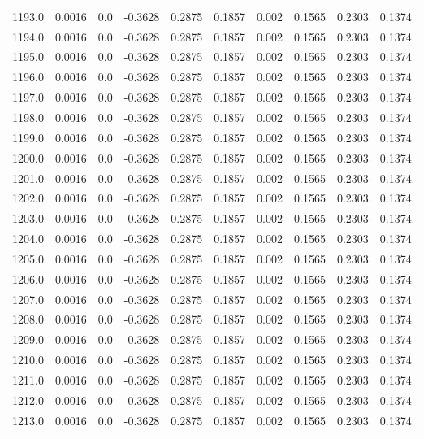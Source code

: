 \begin{longtable}{lrrrrrrrrr}
1193.0 & 0.0016 & 0.0 & -0.3628 & 0.2875 & 0.1857 & 0.002 & 0.1565 & 0.2303 & 0.1374 \\
1194.0 & 0.0016 & 0.0 & -0.3628 & 0.2875 & 0.1857 & 0.002 & 0.1565 & 0.2303 & 0.1374 \\
1195.0 & 0.0016 & 0.0 & -0.3628 & 0.2875 & 0.1857 & 0.002 & 0.1565 & 0.2303 & 0.1374 \\
1196.0 & 0.0016 & 0.0 & -0.3628 & 0.2875 & 0.1857 & 0.002 & 0.1565 & 0.2303 & 0.1374 \\
1197.0 & 0.0016 & 0.0 & -0.3628 & 0.2875 & 0.1857 & 0.002 & 0.1565 & 0.2303 & 0.1374 \\
1198.0 & 0.0016 & 0.0 & -0.3628 & 0.2875 & 0.1857 & 0.002 & 0.1565 & 0.2303 & 0.1374 \\
1199.0 & 0.0016 & 0.0 & -0.3628 & 0.2875 & 0.1857 & 0.002 & 0.1565 & 0.2303 & 0.1374 \\
1200.0 & 0.0016 & 0.0 & -0.3628 & 0.2875 & 0.1857 & 0.002 & 0.1565 & 0.2303 & 0.1374 \\
1201.0 & 0.0016 & 0.0 & -0.3628 & 0.2875 & 0.1857 & 0.002 & 0.1565 & 0.2303 & 0.1374 \\
1202.0 & 0.0016 & 0.0 & -0.3628 & 0.2875 & 0.1857 & 0.002 & 0.1565 & 0.2303 & 0.1374 \\
1203.0 & 0.0016 & 0.0 & -0.3628 & 0.2875 & 0.1857 & 0.002 & 0.1565 & 0.2303 & 0.1374 \\
1204.0 & 0.0016 & 0.0 & -0.3628 & 0.2875 & 0.1857 & 0.002 & 0.1565 & 0.2303 & 0.1374 \\
1205.0 & 0.0016 & 0.0 & -0.3628 & 0.2875 & 0.1857 & 0.002 & 0.1565 & 0.2303 & 0.1374 \\
1206.0 & 0.0016 & 0.0 & -0.3628 & 0.2875 & 0.1857 & 0.002 & 0.1565 & 0.2303 & 0.1374 \\
1207.0 & 0.0016 & 0.0 & -0.3628 & 0.2875 & 0.1857 & 0.002 & 0.1565 & 0.2303 & 0.1374 \\
1208.0 & 0.0016 & 0.0 & -0.3628 & 0.2875 & 0.1857 & 0.002 & 0.1565 & 0.2303 & 0.1374 \\
1209.0 & 0.0016 & 0.0 & -0.3628 & 0.2875 & 0.1857 & 0.002 & 0.1565 & 0.2303 & 0.1374 \\
1210.0 & 0.0016 & 0.0 & -0.3628 & 0.2875 & 0.1857 & 0.002 & 0.1565 & 0.2303 & 0.1374 \\
1211.0 & 0.0016 & 0.0 & -0.3628 & 0.2875 & 0.1857 & 0.002 & 0.1565 & 0.2303 & 0.1374 \\
1212.0 & 0.0016 & 0.0 & -0.3628 & 0.2875 & 0.1857 & 0.002 & 0.1565 & 0.2303 & 0.1374 \\
1213.0 & 0.0016 & 0.0 & -0.3628 & 0.2875 & 0.1857 & 0.002 & 0.1565 & 0.2303 & 0.1374 \\

\end{longtable}

